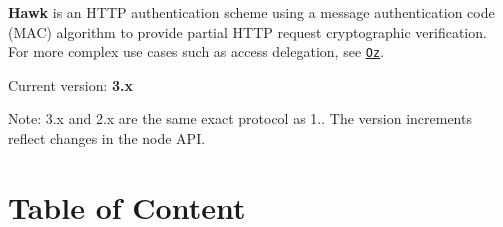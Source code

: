

 {\bfseries Hawk} is an H\+T\+TP authentication scheme using a message authentication code (M\+AC) algorithm to provide partial H\+T\+TP request cryptographic verification. For more complex use cases such as access delegation, see \href{https://github.com/hueniverse/oz}{\tt Oz}.

Current version\+: {\bfseries 3.\+x}

Note\+: 3.\+x and 2.\+x are the same exact protocol as 1.. The version increments reflect changes in the node A\+PI.

\href{http://travis-ci.org/hueniverse/hawk}{\tt }

\section*{Table of Content}


